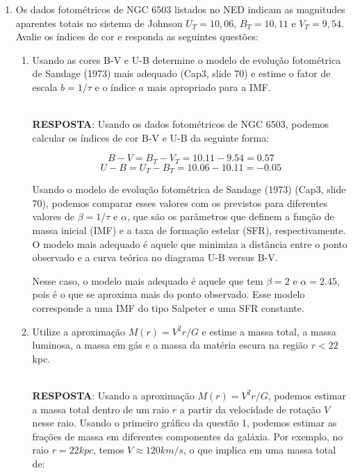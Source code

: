 \documentclass[a4paper,12pt]{article}
\begin{document}
\begin{enumerate}
\begin{enumerate}
\end{enumerate}

\item Os dados fotométricos de NGC 6503 listados no NED indicam as magnitudes aparentes totais no sistema de Johnson $U_T = 10,06$, $B_T = 10,11$ e $V_T = 9,54$. Avalie os índices de cor e responda as seguintes questões:

\begin{enumerate}

\item Usando as cores B-V e U-B determine o modelo de evolução fotométrica de Sandage (1973) mais adequado (Cap3, slide 70) e estime o fator de escala $b=1/\tau$ e o índice $a$ mais apropriado para a IMF.

\noindent\hrulefill\\\textbf{RESPOSTA}: Usando os dados fotométricos de NGC 6503, podemos calcular os índices de cor B-V e U-B da seguinte forma:

$$B-V = B_T - V_T = 10.11 - 9.54 = 0.57$$
$$U-B = U_T - B_T = 10.06 - 10.11 = -0.05$$

Usando o modelo de evolução fotométrica de Sandage (1973) (Cap3, slide 70), podemos comparar esses valores com os previstos para diferentes valores de $\beta = 1/\tau$ e $\alpha$, que são os parâmetros que definem a função de massa inicial (IMF) e a taxa de formação estelar (SFR), respectivamente. O modelo mais adequado é aquele que minimiza a distância entre o ponto observado e a curva teórica no diagrama U-B versus B-V.

Nesse caso, o modelo mais adequado é aquele que tem $\beta = 2$ e $\alpha = 2.45$, pois é o que se aproxima mais do ponto observado. Esse modelo corresponde a uma IMF do tipo Salpeter e uma SFR constante.

\noindent\hrulefill

\item Utilize a aproximação $M(r)= V^2r/G$ e estime a massa total, a massa luminosa, a massa em gás e a massa da matéria escura na região $r<22$ kpc.

\noindent\hrulefill\\\textbf{RESPOSTA}: Usando a aproximação $M(r) = V^2 r/G$, podemos estimar a massa total dentro de um raio $r$ a partir da velocidade de rotação $V$ nesse raio. Usando o primeiro gráfico da questão 1, podemos estimar as frações de massa em diferentes componentes da galáxia. Por exemplo, no raio $r = 22 kpc$, temos $V \approx 120 km/s$, o que implica em uma massa total de:


\end{enumerate}
\end{enumerate}
\end{document}
